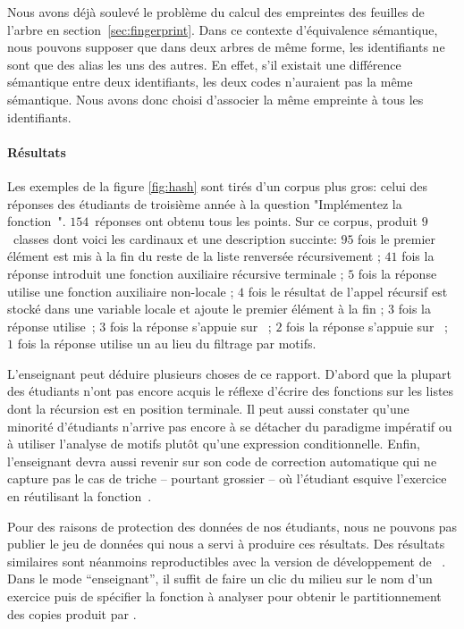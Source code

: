 Nous avons déjà soulevé le problème du calcul des empreintes des
feuilles de l'arbre en section~\ref{sec:fingerprint}. Dans ce contexte
d'équivalence sémantique, nous pouvons supposer que dans deux arbres
de même forme, les identifiants ne sont que des alias les uns des
autres. En effet, s'il existait une différence sémantique entre deux
identifiants, les deux codes n'auraient pas la même sémantique.  Nous
avons donc choisi d'associer la même empreinte à tous les
identifiants.  

\paragraph{Résultats}

Les exemples de la figure \ref{fig:hash} sont tirés d'un corpus plus
gros: celui des réponses des étudiants de troisième année à la
question "Implémentez la fonction~". $154$~réponses ont
obtenu tous les points. Sur ce corpus, {\Asak} produit $9$~classes
dont voici les cardinaux et une description succinte: $95$ fois le
premier élément est mis à la fin du reste de la liste renversée
récursivement ; $41$ fois la réponse introduit une fonction auxiliaire
récursive terminale ; $5$ fois la réponse utilise une fonction
auxiliaire non-locale ; $4$ fois le résultat de l'appel récursif est
stocké dans une variable locale et ajoute le premier élément à la fin
; $3$ fois la réponse utilise~; $3$ fois la réponse
s'appuie sur~ ; $2$ fois la réponse s'appuie
sur~ ; $1$ fois la réponse utilise
un  au lieu du filtrage par motifs.

L'enseignant peut déduire plusieurs choses de ce rapport. D'abord que
la plupart des étudiants n'ont pas encore acquis le réflexe d'écrire
des fonctions sur les listes dont la récursion est en position
terminale. Il peut aussi constater qu'une minorité d'étudiants
n'arrive pas encore à se détacher du paradigme impératif ou à utiliser
l'analyse de motifs plutôt qu'une expression conditionnelle. Enfin,
l'enseignant devra aussi revenir sur son code de correction automatique
qui ne capture pas le cas de triche -- pourtant grossier -- où l'étudiant
esquive l'exercice en réutilisant la fonction~.

Pour des raisons de protection des données de nos étudiants, nous ne
pouvons pas publier le jeu de données qui nous a servi à produire ces
résultats. Des résultats similaires sont néanmoins reproductibles avec
la version de développement de {\LearnOCaml}~\cite{learnocaml}. Dans le
mode ``enseignant'', il suffit de faire un clic du milieu sur le nom
d'un exercice puis de spécifier la fonction à analyser pour obtenir le
partitionnement des copies produit par {\Asak}.
